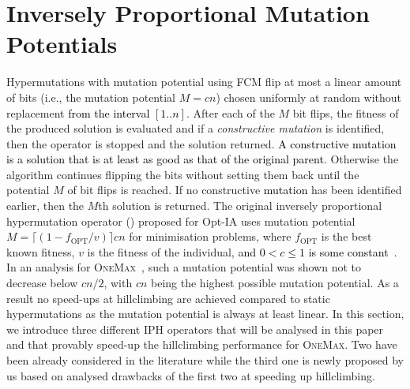 \documentclass[lettersize,journal]{IEEEtran}
\newcommand{\new}[1]{\textcolor{black}{#1}}
\begin{document}





 
 
 
 \section{Inversely Proportional Mutation Potentials} %
 Hypermutations with mutation potential using FCM flip at most a linear amount of bits (i.e., the mutation potential $M=cn$) chosen uniformly at random without replacement \new{from the interval $[1..n]$}. After each of the $M$ bit flips, the fitness of the produced solution is evaluated and if a {\it constructive mutation} is identified, then the operator is stopped and the solution returned. \new{A  constructive mutation is a solution that is at least as good as that of the original parent.}
 Otherwise the algorithm continues flipping the bits without setting them back until the potential $M$ of bit flips is reached. If no constructive \new{mutation} has been identified earlier, then the $M$th solution is returned.  
 The original inversely proportional hypermutation operator (\IPHfcm{}) proposed for Opt-IA uses mutation potential  $M=\lceil(1-f_{\text{OPT}}/v)\rceil cn$ for minimisation problems, where $f_{\text{OPT}}$ is the best known fitness, $v$ is the fitness of the individual, 
 \new{and $0<c\leq 1$ is some constant}~\cite{CutelloNicosiaPavoneTimmis2007,JansenZarges2011}. 
 In an analysis for \textsc {OneMax}~\cite{JansenZarges2011}, such a mutation potential was shown not to decrease below $cn/2$, with $cn$ being the highest possible mutation potential.
 	As a result no speed-ups at hillclimbing are achieved compared to static hypermutations as the mutation potential is always at least linear.
 In this section, we introduce three different IPH operators  that will be analysed in this paper and that provably speed-up the hillclimbing  performance for \textsc{OneMax}. Two have been already considered in the literature %
 while the third one is newly proposed by us based on analysed drawbacks of the first two at speeding up hillclimbing.
 
\end{document}
